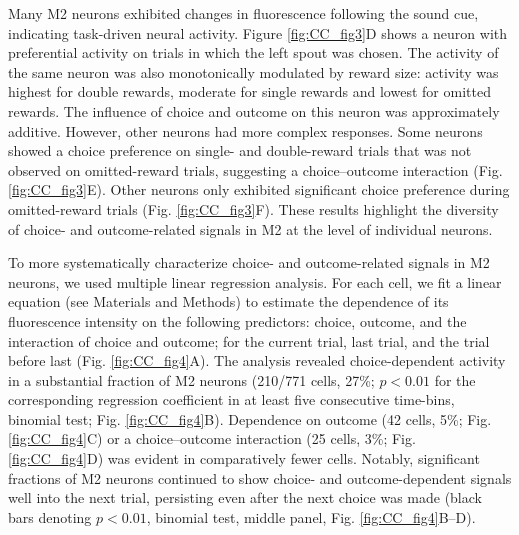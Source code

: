 

Many M2 neurons exhibited changes in fluorescence following the sound cue, indicating task-driven neural activity. Figure \ref{fig:CC_fig3}D shows a neuron with preferential activity on trials in which the left spout was chosen. The activity of the same neuron was also monotonically modulated by reward size: activity was highest for double rewards, moderate for single rewards and lowest for omitted rewards. The influence of choice and outcome on this neuron was approximately additive. However, other neurons had more complex responses. Some neurons showed a choice preference on single- and double-reward trials that was not observed on omitted-reward trials, suggesting a choice–outcome interaction (Fig. \ref{fig:CC_fig3}E). Other neurons only exhibited significant choice preference during omitted-reward trials (Fig. \ref{fig:CC_fig3}F). These results highlight the diversity of choice- and outcome-related signals in M2 at the level of individual neurons.

To more systematically characterize choice- and outcome-related signals in M2 neurons, we used multiple linear regression analysis. For each cell, we fit a linear equation (see Materials and Methods) to estimate the dependence of its fluorescence intensity on the following predictors: choice, outcome, and the interaction of choice and outcome; for the current trial, last trial, and the trial before last (Fig. \ref{fig:CC_fig4}A). The analysis revealed choice-dependent activity in a substantial fraction of M2 neurons (210/771 cells, 27\%; $p < 0.01$ for the corresponding regression coefficient in at least five consecutive time-bins, binomial test; Fig. \ref{fig:CC_fig4}B). Dependence on outcome (42 cells, 5\%; Fig. \ref{fig:CC_fig4}C) or a choice–outcome interaction (25 cells, 3\%; Fig. \ref{fig:CC_fig4}D) was evident in comparatively fewer cells. Notably, significant fractions of M2 neurons continued to show choice- and outcome-dependent signals well into the next trial, persisting even after the next choice was made (black bars denoting $p < 0.01$, binomial test, middle panel, Fig. \ref{fig:CC_fig4}B–D).



